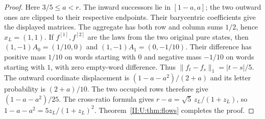 \begin{proof}
Here $3/5\le a<r$. The inward successors lie in $[1-a,a]$;
the two outward ones are clipped to their respective endpoints.
Their barycentric coefficients give the displayed matrices.
The aggregate has both row and column sums $1/2$, hence $x_L=(1,1)$.
If $f^{[1]},f^{[2]}$ are the laws from the two original pure states,
then $(1,-1)A_0=(1/10,0)$ and $(1,-1)A_1=(0,-1/10)$.
Their difference has positive mass $1/10$ on words starting with $0$
and negative mass $-1/10$ on words starting with $1$, with zero
empty-word difference. Thus
$\|f_t-f_s\|_1=|t-s|/5$.
The outward coordinate displacement is
$(1-a-a^2)/(2+a)$ and its letter probability is $(2+a)/10$.
The two occupied rows therefore give $(1-a-a^2)/25$.
The cross-ratio formula gives
$r-a=\sqrt5\,z_L/(1+z_L)$, so
$1-a-a^2=5z_L/(1+z_L)^2$.
Theorem~\ref{II:U:thm:flows} completes the proof.
\end{proof}
